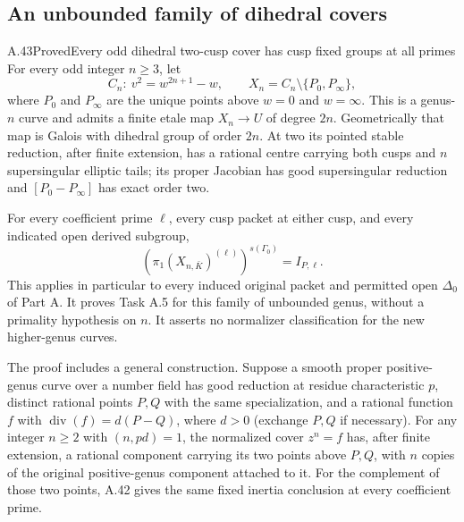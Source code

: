 \subsection{An unbounded family of dihedral covers}

\begin{statement}{A.43}{Proved}{Every odd dihedral two-cusp cover has cusp fixed groups at all primes}
For every odd integer \(n\ge3\), let
\[
 C_n:\ v^2=w^{2n+1}-w,
 \qquad X_n=C_n\setminus\{P_0,P_\infty\},
                                                               \tag{A.43.1}
\]
where \(P_0\) and \(P_\infty\) are the unique points
above \(w=0\) and \(w=\infty\). This is a genus-\(n\)
curve and admits a finite etale map \(X_n\to U\) of
degree \(2n\). Geometrically that map is Galois with
dihedral group of order \(2n\). At two its pointed
stable reduction, after finite extension, has a rational
centre carrying both cusps and \(n\) supersingular
elliptic tails; its proper Jacobian has good supersingular
reduction and \([P_0-P_\infty]\) has exact order two.

For every coefficient prime \(\ell\), every cusp packet
at either cusp, and every indicated open derived subgroup,
\[
             \left(\pi_1(X_{n,\bar K})^{(\ell)}\right)^{s(\Gamma_0)}
                                    =I_{P,\ell}.     \tag{A.43.2}
\]
This applies in particular to every induced original packet
and permitted open \(\Delta_0\) of Part A. It proves
Task A.5 for this family of unbounded genus, without a
primality hypothesis on \(n\). It asserts no normalizer
classification for the new higher-genus curves.

The proof includes a general construction. Suppose a smooth
proper positive-genus curve over a number field has good reduction at residue
characteristic \(p\), distinct rational points \(P,Q\)
with the same specialization, and a rational function
\(f\) with \(\operatorname{div}(f)=d(P-Q)\), where
\(d>0\) (exchange \(P,Q\) if necessary).
For any integer \(n\ge2\) with \((n,pd)=1\), the normalized cover \(z^n=f\)
has, after finite extension, a rational component carrying
its two points above \(P,Q\), with \(n\) copies of the
original positive-genus component attached to it. For the
complement of those two points, A.42 gives the same fixed
inertia conclusion at every coefficient prime.
\end{statement}

